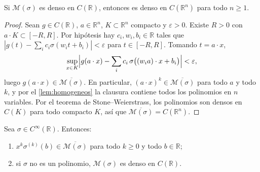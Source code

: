 \begin{lema}\label{lem:reduccion}
Si $\mathcal{M}(\sigma)$ es denso en $C(\mathbb{R})$, entonces es denso en $C(\mathbb{R}^n)$ para todo $n\ge 1$.
\end{lema}

\begin{proof}
Sean $g\in C(\mathbb{R})$, $a\in\mathbb{R}^n$, $K\subset\mathbb{R}^n$ compacto y $\varepsilon>0$. Existe $R>0$ con $a\cdot K\subset[-R,R]$. Por hipótesis hay $c_i, w_i, b_i\in\mathbb{R}$ tales que $|g(t)-\sum_i c_i\sigma(w_i t+b_i)|<\varepsilon$ para $t\in[-R,R]$. Tomando $t=a\cdot x$,
\[
  \sup_{x\in K}\Bigl|g(a\cdot x)-\sum_i c_i\,\sigma\bigl((w_i a)\cdot x+b_i\bigr)\Bigr|<\varepsilon,
\]
luego $g(a\cdot x)\in\overline{\mathcal{M}(\sigma)}$. En particular, $(a\cdot x)^k\in\overline{\mathcal{M}(\sigma)}$ para todo $a$ y todo $k$, y por el \cref{lem:homogeneos} la clausura contiene todos los polinomios en $n$ variables. Por el teorema de Stone--Weierstrass, los polinomios son densos en $C(K)$ para todo compacto $K$, así que $\overline{\mathcal{M}(\sigma)}=C(\mathbb{R}^n)$.
\end{proof}

\begin{lema}\label{lem:suave}
Sea $\sigma\in C^\infty(\mathbb{R})$. Entonces:
\begin{enumerate}
  \item[(a)] $x^k\sigma^{(k)}(b)\in\overline{\mathcal{M}(\sigma)}$ para todo $k\ge 0$ y todo $b\in\mathbb{R}$;
  \item[(b)] si $\sigma$ no es un polinomio, $\mathcal{M}(\sigma)$ es denso en $C(\mathbb{R})$.
\end{enumerate}
\end{lema}

